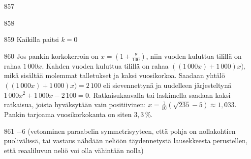 \begin{Vastaus}{857}
	
\end{Vastaus}
\begin{Vastaus}{858}
		
\end{Vastaus}
\begin{Vastaus}{859}
Kaikilla paitsi $k=0$
	
\end{Vastaus}
\begin{Vastaus}{860}
	Jos pankin korkokerroin on $x=(1+\frac{p}{100})$, niin vuoden kuluttua tilillä on rahaa $1\,000x$. Kahden vuoden kuluttua tilillä on rahaa $((1\,000x)+1\,000)x)$, mikä sisältää molemmat talletukset ja kaksi vuosikorkoa. Saadaan yhtälö $((1\,000x)+1\,000)x)=2\,100$ eli sievennettynä ja uudelleen järjesteltynä $1\,000x^2+1\,000x-2\,100=0$. Ratkaisukaavalla tai laskimella saadaan kaksi ratkaisua, joista hyväksytään vain positiivinen: $x=\frac{1}{10}(\sqrt{235}-5)\approx1,033$. Pankin tarjoama vuosikorkokanta on siten $3,3$\,\%.
	
\end{Vastaus}
\begin{Vastaus}{861}
	$-6$ (vetoaminen paraabelin symmetrisyyteen, että pohja on nollakohtien puolivälissä, tai vastaus nähdään neliöön täydennetystä lausekkeesta perustellen, että reaaliluvun neliö voi olla vähintään nolla)
	
\end{Vastaus}
